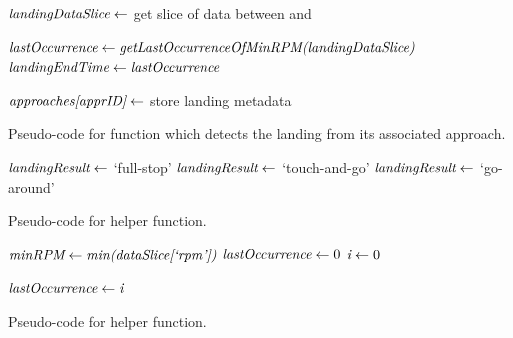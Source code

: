 \begin{algorithm}
\begin{algorithmic}[1]
            	\State $ \textit{landingDataSlice} \gets $ get slice of data between  and 
                
            	\State $ \textit{lastOccurrence} \gets \textit{getLastOccurrenceOfMinRPM(landingDataSlice)} $
                \State $ \textit{landingEndTime} \gets \textit{lastOccurrence} $
            \EndIf
            
            \State $ \textit{approaches[apprID]} \gets $ store landing metadata
            \State \Return {}
        \EndFunction
        \end{algorithmic}
        \caption{Pseudo-code for function which detects the landing from its associated approach.}
        \label{alg:detect_landing}
    \end{algorithm}
    
    
    \begin{algorithm}
    	\begin{algorithmic}[1]
                    \State $ \textit{landingResult} \gets $ `full-stop'
                    \State $ \textit{landingResult} \gets $ `touch-and-go'
                \Else
                    \State $ \textit{landingResult} \gets $ `go-around'
                \EndIf
                \State \Return {}
            \EndFunction
        \end{algorithmic}
        \caption{Pseudo-code for  helper function.}
        \label{alg:landing_result_helper}
    \end{algorithm}
    
    
    \begin{algorithm}
    	\begin{algorithmic}[1]
        		\State $ \textit{minRPM} \gets \textit{min(dataSlice[`rpm'])} $
                \State $ \textit{lastOccurrence} \gets 0 $
                \State $ \textit{i} \gets 0 $
                
                 
						\State $ \textit{lastOccurrence} \gets \textit{i} $
                    \EndIf
                \EndWhile
                \State \Return {}
            \EndFunction
        \end{algorithmic}
        \caption{Pseudo-code for  helper function.}
        \label{alg:last_rpm_helper}
    \end{algorithm}
    
